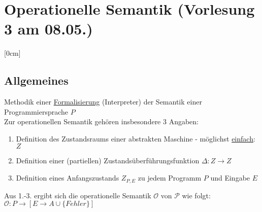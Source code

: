 \section{Operationelle Semantik \tiny (Vorlesung 3 am 08.05.)}
[0cm]
\subsection{Allgemeines}
Methodik einer \underline{Formalisierung} (Interpreter) der Semantik einer Programmiersprache $P$\\
Zur operationellen Semantik gehören insbesondere 3 Angaben:
\begin{enumerate}
	\item Definition des Zustandsraums einer abstrakten Maschine - möglichst \underline{einfach}: $Z$
	\item Definition einer (partiellen) Zustandsüberführungsfunktion $\Delta:Z \rightarrow Z$
	\item Definition eines Anfangszustands $Z_{P,E}$ zu jedem Programm $P$ und Eingabe $E$
\end{enumerate}
Aus 1.-3. ergibt sich die operationelle Semantik $\mathcal{O}$  von $\mathcal{P}$ wie folgt:\\
$\mathcal{O}: P\rightarrow[E\rightarrow A\cup \{Fehler\}]$\\

